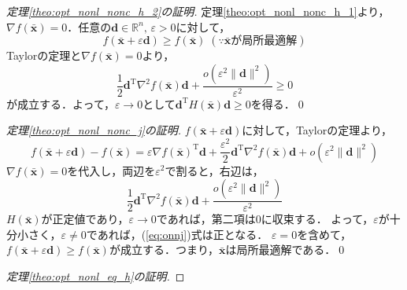 \documentclass[dvipdfmx]{jsreport}
\begin{document}
\begin{proof}[定理\ref{theo:opt_nonl_nonc_h_2}の証明]
  定理\ref{theo:opt_nonl_nonc_h_1}より，$\nabla f(\bar{\bm{x}}) = 0$．任意の$\bm{d} \in \mathbb{R}^n, \, \varepsilon > 0$に対して，
  \begin{equation}
    f(\bar{\bm{x}} + \varepsilon \bm{d}) \geq f(\bar{\bm{x}}) \; (\because \bar{\bm{x}}が局所最適解)\nonumber
  \end{equation}
  Taylorの定理と$\nabla f(\bar{\bm{x}}) = 0$より，
  \begin{equation}
    \frac{1}{2} \bm{d}^{\mathrm{T}} {\nabla}^2 f(\bar{\bm{x}}) \bm{d} + \frac{o({\varepsilon}^2 \|\bm{d}\|^2)}{{\varepsilon}^2} \geq 0 \nonumber
  \end{equation}
  が成立する．よって，$\varepsilon \rightarrow 0$として$\bm{d}^{\mathrm{T}} H(\bar{\bm{x}}) \bm{d} \geq 0$を得る．\qed
\end{proof}

\begin{proof}[定理\ref{theo:opt_nonl_nonc_j}の証明]
  $f(\bar{\bm{x}} + \varepsilon \bm{d})$に対して，Taylorの定理より，
  \begin{equation}
    f(\bar{\bm{x}} + \varepsilon \bm{d}) - f(\bar{\bm{x}}) = \varepsilon \nabla f(\bar{\bm{x}})^{\mathrm{T}}\bm{d} + \frac{{\varepsilon}^2}{2} \bm{d}^{\mathrm{T}} {\nabla}^2 f(\bar{\bm{x}}) \bm{d} + o({\varepsilon}^2 \|\bm{d}\|^2) \nonumber
  \end{equation}
  $\nabla f(\bar{\bm{x}}) = 0$を代入し，両辺を${\varepsilon}^2$で割ると，右辺は，
  \begin{equation}\label{eq:onnj}
    \frac{1}{2} \bm{d}^{\mathrm{T}} {\nabla}^2 f(\bar{\bm{x}}) \bm{d} + \frac{o({\varepsilon}^2 \|\bm{d}\|^2)}{{\varepsilon}^2}
  \end{equation}
  $H(\bar{\bm{x}})$が正定値であり，$\varepsilon \rightarrow 0$であれば，第二項は$0$に収束する．
  よって，$\varepsilon$が十分小さく，$\varepsilon \neq 0$であれば，(\ref{eq:onnj})式は正となる．
  $\varepsilon = 0$を含めて，
  $f(\bar{\bm{x}} + \varepsilon \bm{d}) \geq f(\bar{\bm{x}})$が成立する．つまり，$\bar{\bm{x}}$は局所最適解である．\qed
\end{proof}

\begin{proof}[定理\ref{theo:opt_nonl_eq_h}の証明]

\end{proof}
\end{document}
